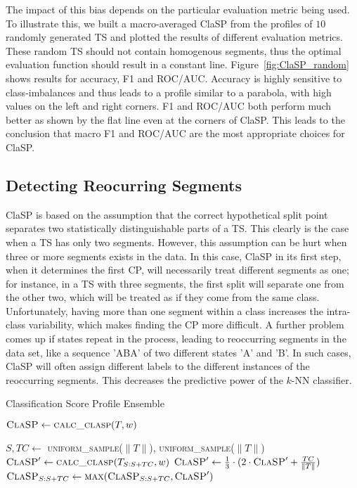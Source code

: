 \documentclass[pdflatex,sn-basic]{sn-jnl}
\begin{document}
The impact of this bias depends on the particular evaluation metric being used. To illustrate this, we built a macro-averaged ClaSP from the profiles of $10$ randomly generated TS and plotted the results of different evaluation metrics. These random TS should not contain homogenous segments, thus the optimal evaluation function should result in a constant line. Figure~\ref{fig:ClaSP_random} shows results for accuracy, F1 and ROC/AUC. Accuracy is highly sensitive to class-imbalances and thus leads to a profile similar to a parabola, with high values on the left and right corners. F1 and ROC/AUC both perform much better as shown by the flat line even at the corners of ClaSP. This leads to the conclusion that macro F1 and ROC/AUC are the most appropriate choices for ClaSP. 


\subsection{Detecting Reocurring Segments} \label{sec:ensembling}

ClaSP is based on the assumption that the correct hypothetical split point separates two statistically distinguishable parts of a TS. This clearly is the case when a TS has only two segments. However, this assumption can be hurt when three or more segments exists in the data. In this case, ClaSP in its first step, when it determines the first CP, will necessarily treat different segments as one; for instance, in a TS with three segments, the first split will separate one from the other two, which will be treated as if they come from the same class. Unfortunately, having more than one segment within a class increases the intra-class variability, which makes finding the CP more difficult. A further problem comes up if states repeat in the process, leading to reoccurring segments in the data set, like a sequence 'ABA' of two different states 'A' and 'B'. In such cases, ClaSP will often assign different labels to the different instances of the reoccurring segments. This decreases the predictive power of the $k$-NN classifier. 

\begin{algorithm}[t]
	\caption{Classification Score Profile Ensemble}\label{alg:clasp_ensemble}
	\begin{algorithmic}[1]
			\State $\textsc{ClaSP} \gets \textsc{calc\_clasp}(T, w) $

                \State $S, TC \gets $ \textsc{uniform\_sample}($\|T\|$), \textsc{uniform\_sample}($\|T\|$)
			    \State $\textsc{ClaSP}' \gets \textsc{calc\_clasp}(T_{S:S+TC}, w)$
			    \State $\textsc{ClaSP}' \gets \frac{1}{3} \cdot (2 \cdot \textsc{ClaSP}' +
			    \frac{TC}{\|T\|}) $
			    \State $\textsc{ClaSP}_{S:S+TC} \gets \textsc{max}(\textsc{ClaSP}_{S:S+TC}, \textsc{ClaSP}')$
			    
			\EndFor 
			\State {}
		\EndProcedure
	\end{algorithmic}
\end{algorithm}
\end{document}
